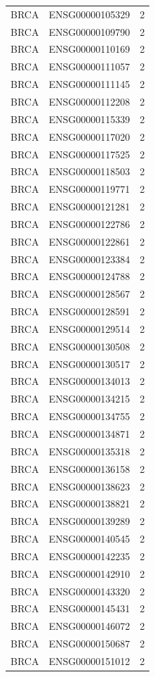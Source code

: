 \begin{longtable}{p{}p{}p{}}
BRCA & ENSG00000105329 & 2 \\
BRCA & ENSG00000109790 & 2 \\
BRCA & ENSG00000110169 & 2 \\
BRCA & ENSG00000111057 & 2 \\
BRCA & ENSG00000111145 & 2 \\
BRCA & ENSG00000112208 & 2 \\
BRCA & ENSG00000115339 & 2 \\
BRCA & ENSG00000117020 & 2 \\
BRCA & ENSG00000117525 & 2 \\
BRCA & ENSG00000118503 & 2 \\
BRCA & ENSG00000119771 & 2 \\
BRCA & ENSG00000121281 & 2 \\
BRCA & ENSG00000122786 & 2 \\
BRCA & ENSG00000122861 & 2 \\
BRCA & ENSG00000123384 & 2 \\
BRCA & ENSG00000124788 & 2 \\
BRCA & ENSG00000128567 & 2 \\
BRCA & ENSG00000128591 & 2 \\
BRCA & ENSG00000129514 & 2 \\
BRCA & ENSG00000130508 & 2 \\
BRCA & ENSG00000130517 & 2 \\
BRCA & ENSG00000134013 & 2 \\
BRCA & ENSG00000134215 & 2 \\
BRCA & ENSG00000134755 & 2 \\
BRCA & ENSG00000134871 & 2 \\
BRCA & ENSG00000135318 & 2 \\
BRCA & ENSG00000136158 & 2 \\
BRCA & ENSG00000138623 & 2 \\
BRCA & ENSG00000138821 & 2 \\
BRCA & ENSG00000139289 & 2 \\
BRCA & ENSG00000140545 & 2 \\
BRCA & ENSG00000142235 & 2 \\
BRCA & ENSG00000142910 & 2 \\
BRCA & ENSG00000143320 & 2 \\
BRCA & ENSG00000145431 & 2 \\
BRCA & ENSG00000146072 & 2 \\
BRCA & ENSG00000150687 & 2 \\
BRCA & ENSG00000151012 & 2 \\

\end{longtable}
